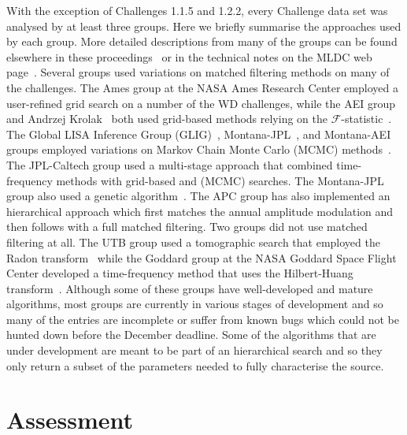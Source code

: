\documentclass[12pt]{iopart}
\begin{document}
With the exception of Challenges 1.1.5 and 1.2.2, every Challenge data set was analysed by at least three groups. Here we briefly summarise the approaches used by each group. More detailed descriptions from many of the groups can be found elsewhere in these proceedings~\cite{nayak07, roever07, stroeer07} or in the technical notes on the MLDC web page~\cite{MLDCweb}. Several groups used variations on matched filtering methods on many of the challenges. The Ames group at the NASA Ames Research Center employed a user-refined grid search on a number of the WD challenges, while the AEI group and Andrzej Krolak~\cite{krolak04} both used grid-based methods relying on the $\mathcal{F}$-statistic~\cite{jaranowski98}. The Global LISA Inference Group (GLIG)~\cite{stroeer06,umstatter05,wickham06}, Montana-JPL~\cite{crowder06b}, and Montana-AEI groups employed variations on Markov Chain Monte Carlo (MCMC) methods~\cite{cornish06}. The JPL-Caltech group used a multi-stage approach that combined time-frequency methods with grid-based and (MCMC) searches. The Montana-JPL group also used a genetic algorithm~\cite{crowder06a}. The APC group has also implemented an hierarchical approach which first matches the annual amplitude modulation and then follows with a full matched filtering. Two groups did not use matched filtering at all. The UTB group used a tomographic search that employed the Radon transform~\cite{mohanty06} while the Goddard group at the NASA Goddard Space Flight Center developed a time-frequency method that uses the Hilbert-Huang transform~\cite{huang98}. Although some of these groups have well-developed and mature algorithms, most groups are currently in various stages of development and so many of the entries are incomplete or suffer from known bugs which could not be hunted down before the December deadline. Some of the algorithms that are under development are meant to be part of an hierarchical search and so they only return a subset of the parameters needed to fully characterise the source.

\section{Assessment}
\end{document}
